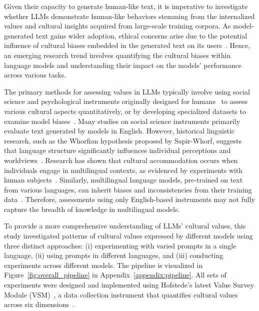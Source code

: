 \documentclass[11pt]{article}
\begin{document}
Given their capacity to generate human-like text, it is imperative to investigate whether LLMs demonstrate human-like behaviors stemming from the internalized values and cultural insights acquired from large-scale training corpora. As model-generated text gains wider adoption, ethical concerns arise due to the potential influence of cultural biases embedded in the generated text on its users~\cite{kumar-etal-2023-language}. Hence, an emerging research trend involves quantifying the cultural biases within language models and understanding their impact on the models' performance across various tasks.

The primary methods for assessing values in LLMs typically involve using social science and psychological instruments originally designed for humans~\cite{feng-etal-2023-pretraining,arora2023probing} to assess various cultural aspects quantitatively, or by developing specialized datasets to examine model biases~\cite{parrish2022bbq, huang2023cbbq}.  Many studies on social science instruments primarily evaluate text generated by models in English. However, historical linguistic research, such as the Whorfian hypothesis proposed by Sapir-Whorf, suggests that language structure significantly influences individual perceptions and worldviews~\cite{Kay1984-hk}. Research has shown that cultural accommodation occurs when individuals engage in multilingual contexts, as evidenced by experiments with human subjects~\cite{doi:10.1080/14708470208668081}. Similarly, multilingual language models, pre-trained on text from various languages, can inherit biases and inconsistencies from their training data~\cite{app11073184}. Therefore, assessments using only English-based instruments may not fully capture the breadth of knowledge in multilingual models.


To provide a more comprehensive understanding of LLMs' cultural values, this study investigated patterns of cultural values expressed by different models using three distinct approaches: (i) experimenting with varied prompts in a single language, (ii) using prompts in different languages, and (iii) conducting experiments across different models. The pipeline is visualized in Figure~\ref{fig:overall_pipeline} in Appendix~\ref{appendix:pipeline}. All sets of experiments were designed and implemented using Hofstede's latest Value Survey Module (VSM)~\cite{vsm2013-jj}, a data collection instrument that quantifies cultural values across six dimensions~\cite{TARAS2023101386}.
\end{document}
